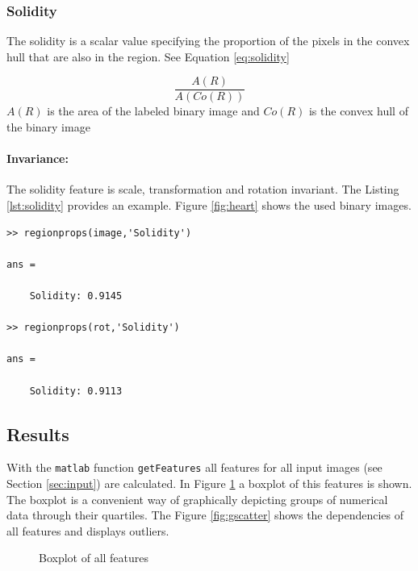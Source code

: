 \documentclass[a4paper,psfig,subfigure,epsfig,fleqn,amssmb,float,caption,fontenc,ausarbeitung]{article}
\begin{document}
\subsubsection{Solidity}
\label{sec:solidity}

The solidity is a scalar value specifying the proportion of the pixels in the 
convex hull that are also in the region. See Equation \ref{eq:solidity}

\begin{equation}
\frac{A(R)}{A(Co(R))}
\label{eq:solidity}
\end{equation}
$A(R)$ is the area of the labeled binary image and $Co(R)$ is the convex hull of the binary image

\paragraph{Invariance:} The solidity feature is scale, transformation and 
rotation invariant. The Listing \ref{lst:solidity} provides an example. 
Figure \ref{fig:heart} shows the used binary images.
\begin{lstlisting}[caption=Calculate solidity in matlab, label=lst:solidity]
>> regionprops(image,'Solidity')

ans = 

    Solidity: 0.9145

>> regionprops(rot,'Solidity')

ans = 

    Solidity: 0.9113
\end{lstlisting}

\subsection{Results}
\label{sec:fResults}

With the {\tt matlab} function {\tt getFeatures} all features for all input 
images (see Section \ref{sec:input}) are calculated. In Figure \ref{fig:boxplot} 
a boxplot  of this features is shown. The boxplot is a convenient way of 
graphically depicting groups of numerical data through their quartiles. 
\cite{tukey1977exploratory}
The Figure \ref{fig:gscatter} shows the dependencies of all features and displays outliers.

\begin{figure}
	\centering
	\newlength\figureheight 
	\newlength\figurewidth 
	\setlength\figureheight{6cm} 
	\setlength\figurewidth{10cm}
	
	\caption{Boxplot of all features}
	\label{fig:boxplot}
\end{figure}
\end{document}

